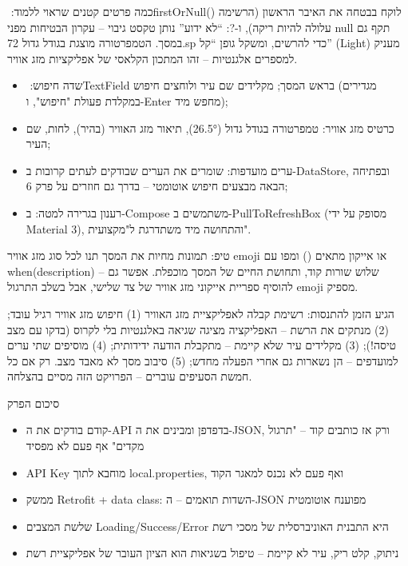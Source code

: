 כמה פרטים קטנים שראוי ללמוד: ‏firstOrNull() לוקח בבטחה את האיבר הראשון (הרשימה עלולה להיות ריקה), ו-?: “לא ידוע” נותן טקסט גיבוי – עקרון הבטיחות מפני null תקף גם במסך. הטמפרטורה מוצגת בגודל גדול 72.sp כדי להרשים, ומשקל גופן “קל” (Light) מעניק למספרים אלגנטיות – זהו המתכון הקלאסי של אפליקציות מזג אוויר.



\begin{itemize}
  \item שדה חיפוש: ‏TextField בראש המסך; מקלידים שם עיר ולוחצים חיפוש (מגדירים במקלדת פעולת "חיפוש", ו-Enter מחפש מיד);
  \item כרטיס מזג אוויר: טמפרטורה בגודל גדול (26.5°), תיאור מזג האוויר (בהיר), לחות, שם העיר;
  \item ערים מועדפות: שומרים את הערים שבודקים לעתים קרובות ב-DataStore, ובפתיחה הבאה מבצעים חיפוש אוטומטי – בדרך גם חוזרים על פרק 6;
  \item רענון בגרירה למטה: ב-Compose משתמשים ב-PullToRefreshBox (מסופק על ידי Material 3), והתחושה מיד משתדרגת ל"מקצועית".
\end{itemize}

\begin{tcbinfo}{טיפ: תמונות מחיות את המסך}
תנו לכל סוג מזג אוויר emoji או אייקון מתאים () ומפו עם when(description) – שלוש שורות קוד, ותחושת החיים של המסך מוכפלת. אפשר גם להוסיף ספריית אייקוני מזג אוויר של צד שלישי, אבל בשלב התרגול emoji מספיק.

\end{tcbinfo}

\begin{tcbpractice}{הגיע הזמן להתנסות: רשימת קבלה לאפליקציית מזג האוויר}
(1) חיפוש מזג אוויר רגיל עובד; (2) מנתקים את הרשת – האפליקציה מציגה שגיאה באלגנטיות בלי לקרוס (בדקו עם מצב טיסה!); (3) מקלידים עיר שלא קיימת – מתקבלת הודעה ידידותית; (4) מוסיפים שתי ערים למועדפים – הן נשארות גם אחרי הפעלה מחדש; (5) סיבוב מסך לא מאבד מצב. רק אם כל חמשת הסעיפים עוברים – הפרויקט הזה מסיים בהצלחה.

\end{tcbpractice}

\begin{tcbsummary}{סיכום הפרק}
\begin{itemize}
  \item קודם בודקים את ה-API בדפדפן ומבינים את ה-JSON, ורק אז כותבים קוד – "תרגול מקדים" אף פעם לא מפסיד
  \item ‏API Key מוחבא לתוך local.properties, ואף פעם לא נכנס למאגר הקוד
  \item ממשק Retrofit + data class: השדות תואמים – ה-JSON מפוענח אוטומטית
  \item שלשת המצבים Loading/Success/Error היא התבנית האוניברסלית של מסכי רשת
  \item ניתוק, קלט ריק, עיר לא קיימת – טיפול בשגיאות הוא הציון העובר של אפליקציית רשת
\end{itemize}

\end{tcbsummary}
